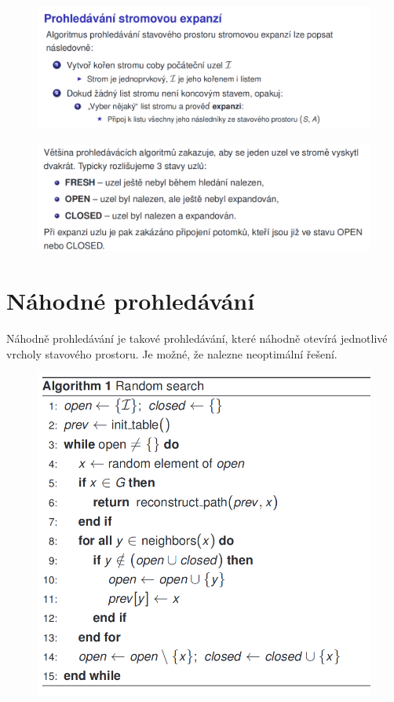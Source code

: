 \documentclass[12pt]{article}
\begin{document}
\begin{figure}[!htb]
\includegraphics[width=\linewidth]{prohledavani}
\end{figure}

\begin{figure}[!htb]
\includegraphics[width=\linewidth]{fresh-open-closed}
\end{figure}


\section{Náhodné prohledávání}
Náhodně prohledávání je takové prohledávání, které náhodně otevírá jednotlivé vrcholy stavového prostoru. Je možné, že nalezne neoptimální řešení.
\begin{figure}[!htb]
\includegraphics[width=0.5\linewidth]{random}
\end{figure}
\end{document}
